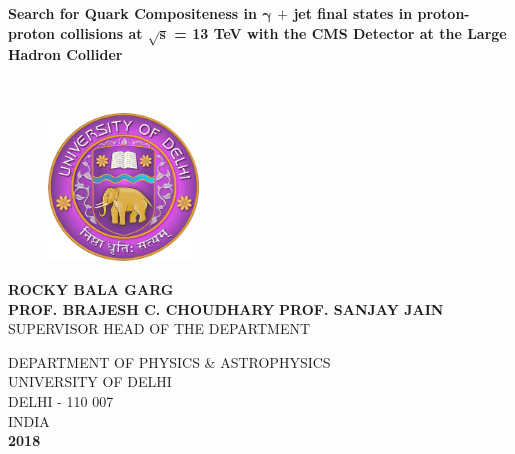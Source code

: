 \documentclass[12pt,a4]{article}
\begin{document}

\pagestyle{plain}

\thispagestyle{empty}

\begin{center}

{\Large \textbf{Search for Quark Compositeness in $\mathbold{\gamma}$ $+$ jet final states in proton-proton collisions at $\mathbold{\sqrt{s}}$ = 13 TeV with the CMS Detector at the Large Hadron Collider}}
\vspace{1cm}

\\

\vspace{8mm}
\begin{figure}[h]
\centering
\includegraphics[width=4cm]{DU_logo.png}
\end{figure}

\vspace{13mm}
\noindent\uppercase{\large{\vspace{2cm} \textbf{Rocky Bala Garg}\\}}
\vspace{15mm}
\uppercase{\large{\textbf{Prof. Brajesh C. Choudhary} \hspace{0.9cm} \textbf{Prof. Sanjay Jain}}}\\
\uppercase{\hspace{2.2cm}\small{Supervisor \hspace{4.3cm} Head of the Department}}\\

\vspace{10mm}

\noindent\uppercase{{Department of Physics \& Astrophysics}}\\
\noindent\uppercase{{University of Delhi}}\\
\noindent\uppercase{{Delhi - 110 007\\ India}}\\
\vspace{5mm}
\noindent\uppercase{ \textbf{2018}}\\ 
\end{center}
\end{document}
